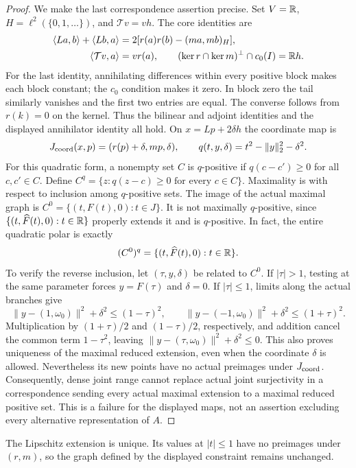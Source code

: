 \begin{proof}
We make the last correspondence assertion precise. Set $V=\mathbb R$,
$H=\ell^2(\{0,1,\ldots\})$, and $\mathcal T v=vh$. The core identities are
\begin{align*}
\langle La,b\rangle+\langle Lb,a\rangle&=2[r(a)r(b)-(ma,mb)_H],\\
\langle \mathcal T v,a\rangle&=v r(a),\qquad
(\ker r\cap\ker m)^\perp\cap c_0(I)=\mathbb R h.
\end{align*}
For the last identity, annihilating differences within every positive
block makes each block constant; the $c_0$ condition makes it zero.
In block zero the tail similarly vanishes and the first two entries
are equal. The converse follows from $r(k)=0$ on the kernel.
Thus the bilinear and adjoint identities and the displayed annihilator
identity all hold.
On $x=Lp+2\delta h$ the coordinate map is
\[
J_{\rm coord}(x,p)=(r(p)+\delta,mp,\delta),\qquad
q(t,y,\delta)=t^2-\|y\|_2^2-\delta^2.
\]
For this quadratic form, a nonempty set $C$ is $q$-positive if
$q(c-c')\ge0$ for all $c,c'\in C$. Define
$C^q=\{z:q(z-c)\ge0\text{ for every }c\in C\}$.
Maximality is with respect to inclusion among $q$-positive sets.
The image of the actual maximal graph is
$C^0=\{(t,F(t),0):t\in J\}$. It is not maximally $q$-positive,
since $\{(t,\widehat F(t),0):t\in\mathbb R\}$ properly extends it and
is $q$-positive. In fact, the entire quadratic polar is exactly
\[
(C^0)^q=\{(t,\widehat F(t),0):t\in\mathbb R\}.
\]
To verify the reverse inclusion, let $(\tau,y,\delta)$ be related
to $C^0$. If $|\tau|>1$, testing at the same parameter forces
$y=F(\tau)$ and $\delta=0$. If $|\tau|\le1$, limits along the
actual branches give
\[
\|y-(1,\omega_0)\|^2+\delta^2\le(1-\tau)^2,\qquad
\|y-(-1,\omega_0)\|^2+\delta^2\le(1+\tau)^2.
\]
Multiplication by $(1+\tau)/2$ and $(1-\tau)/2$, respectively,
and addition cancel the common term $1-\tau^2$, leaving
$\|y-(\tau,\omega_0)\|^2+\delta^2\le0$.
This also proves uniqueness of the maximal reduced extension, even
when the coordinate $\delta$ is allowed. Nevertheless its new points
have no actual preimages under $J_{\rm coord}$.
Consequently, dense joint range cannot replace actual
joint surjectivity in a correspondence sending every actual maximal
extension to a maximal reduced positive set. This is a failure for
the displayed maps, not an assertion excluding every alternative
representation of $A$.
\end{proof}
The Lipschitz extension is unique. Its values at $|t|\le1$ have no
preimages under $(r,m)$, so the graph defined by the displayed
constraint remains unchanged.

